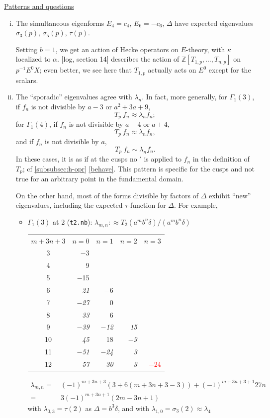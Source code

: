 \documentclass{rs}
\theoremstyle{definition}
\theoremstyle{remark}
\newcommand{\mb}[1]{\mathbb{#1}}
\newcommand{\BZ}{{\mb Z}}
\newcommand{\A}{\alpha}
\renewcommand{\D}{\Delta}
\renewcommand{\d}{\delta}
\newcommand{\G}{\Gamma}
\newcommand{\K}{\kappa}
\renewcommand{\l}{\lambda}
\newcommand{\si}{\sigma}
\newcommand{\T}{\tau}
\renewcommand{\=}{\approx}
\renewcommand{\-}{\sim}
\newcommand{\rd}[1]{\textcolor{red}{#1}}
\numberwithin{equation}{section}
\numberwithin{thm}{section}
\begin{document}
\underline{Patterns and questions} 
\begin{enumerate}[(i)]
 \item The simultaneous eigenforms $E_4 = c_4$, $E_6 = -c_6$, $\D$ 
 have expected eigenvalues $\si_3(p)$, $\si_5(p)$, $\T(p)$.  

 Setting $b = 1$, we get an action of Hecke operators on $E$-theory, with $\K$ localized to $\A$.  
 [log, section 14] describes the action of $\BZ[T_{1,p}, \ldots, T_{n,p}]$ on $p^{-1} E^0 X$; 
 even better, we see here that $T_{1,p}$ actually acts on $E^0$ except for the scalars.  

 \item \label{oversing} The ``sporadic'' eigenvalues agree with $\l_n$.  
 In fact, more generally, for $\G_1(3)$, if $f_n$ is not divisible by $a - 3$ or $a^2 + 3 a + 9$, 
 \[
  T_p ~ f_n \= \l_n f_n; 
 \]
 for $\G_1(4)$, if $f_n$ is not divisible by $a - 4$ or $a + 4$, 
 \[
  T_p ~ f_n \= \l_n f_n, 
 \]
 and if $f_n$ is not divisible by $a$, 
 \[
  T_p ~ f_n \- \l_n f_n.  
 \]
 In these cases, it is as if at the cusps no $'$ is applied to $f_n$ in the definition of $T_p$; cf \ref{subsubsec:h-opr} \eqref{behave}.  
 This pattern is specific for the cusps and not true for an arbitrary point in the fundamental domain.  

 On the other hand, most of the forms divisible by factors of $\D$ exhibit ``new'' eigenvalues, including the expected $\T$-function for $\D$.  
 For example, 
 \begin{itemize}
  \item $\G_1(3)$ at 2 (\texttt{t2.nb}): $\l_{m,n} :\= T_2(a^m b^n \d) / (a^m b^n \d)$ \\
  \begin{tabular}{c|rrrr}
   $m + 3 n + 3$ & $n = 0$ & $n = 1$ & $n = 2$ & $n = 3$ \\
   3 & $-$3 & & & \\
   4 & 9 & & & \\
   5 & $-$15 & & & \\
   6 & {\em 21} & $-$6 & & \\
   7 & {\em $-$27} & 0 & & \\
   8 & {\em 33} & 6 & & \\
   9 & {\em $-$39} & {\em $-$12} & {\em 15} & \\
   10 & {\em 45} & 18 & {\em $-$9} & \\
   11 & {\em $-$51} & {\em $-$24} & {\em 3} & \\
   12 & {\em 57} & {\em 30} & {\em 3} & \rd{$-$24} 
  \end{tabular}
  \begin{equation*}
   \begin{split}
    \l_{m,n} = & ~ (-1)^{m + 3 n + 3} (3 + 6 (m + 3 n + 3 - 3)) + (-1)^{m + 3 n + 3 + 1} 27 n \\
             = & ~ 3 (-1)^{m + 3 n + 1} (2 m - 3 n + 1) 
   \end{split}
  \end{equation*}
  with $\l_{0,3} = \T(2)$ as $\D = b^3 \d$, and with $\l_{1,0} = \si_3(2) \= \l_4$ 


\end{itemize}
\end{enumerate}
\end{document}
